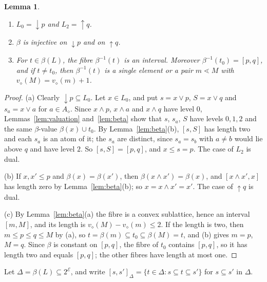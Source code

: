 \documentclass{amsart}
\newtheorem{lemma}[theorem]{Lemma}
\theoremstyle{definition}
\newcommand{\cE}{\mathcal E}
\newcommand{\dm}{\diamond}
\begin{document}
\begin{lemma}\label{lem:levels}
	\begin{enumerate}
		\item[(a)] $L_0={\downarrow}p$ and $L_2={\uparrow}q$.
		\item[(b)] $\beta$ is injective on ${\downarrow}p$ and on ${\uparrow}q$.
		\item[(c)] For $t\in\beta(L)$, the fibre $\beta^{-1}(t)$ is an interval. Moreover $\beta^{-1}(t_0)=[p,q]$, and if $t\ne t_0$, then $\beta^{-1}(t)$ is a single element or a pair $m\lessdot M$ with $v_\dm(M)=v_\dm(m)+1$.
	\end{enumerate}
\end{lemma}

\begin{proof}
	(a) Clearly ${\downarrow}p\subseteq L_0$. Let $x\in L_0$, and put $s=x\vee p$, $S=x\vee q$ and $s_a=x\vee a$ for $a\in A_\dm$. Since $x\wedge p$, $x\wedge a$ and $x\wedge q$ have level $0$, Lemmas~\ref{lem:valuation} and~\ref{lem:beta} show that $s$, $s_a$, $S$ have levels $0,1,2$ and the same $\beta$-value $\beta(x)\cup t_0$. By Lemma~\ref{lem:beta}(b), $[s,S]$ has length two and each $s_a$ is an atom of it; the $s_a$ are distinct, since $s_a=s_b$ with $a\ne b$ would lie above $q$ and have level $2$. So $[s,S]=[p,q]$, and $x\le s=p$. The case of $L_2$ is dual.

	(b) If $x,x'\le p$ and $\beta(x)=\beta(x')$, then $\beta(x\wedge x')=\beta(x)$, and $[x\wedge x',x]$ has length zero by Lemma~\ref{lem:beta}(b); so $x=x\wedge x'=x'$. The case of ${\uparrow}q$ is dual.

	(c) By Lemma~\ref{lem:beta}(a) the fibre is a convex sublattice, hence an interval $[m,M]$, and its length is $v_\dm(M)-v_\dm(m)\le2$. If the length is two, then $m\le p\le q\le M$ by (a), so $t=\beta(m)\subseteq t_0\subseteq\beta(M)=t$, and (b) gives $m=p$, $M=q$. Since $\beta$ is constant on $[p,q]$, the fibre of $t_0$ contains $[p,q]$, so it has length two and equals $[p,q]$; the other fibres have length at most one.
\end{proof}

Let $\Delta=\beta(L)\subseteq2^\cE$, and write $[s,s']_\Delta=\{t\in\Delta:s\subseteq t\subseteq s'\}$ for $s\subseteq s'$ in $\Delta$.
\end{document}
